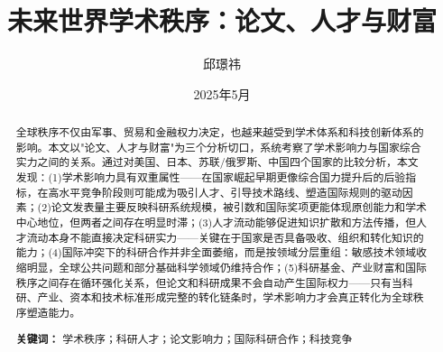 \documentclass[12pt,a4paper]{article}
\title{\heiti\zihao{2} 未来世界学术秩序：论文、人才与财富}
\author{邱璟祎}
\date{2025年5月}
\begin{document}
\maketitle
\thispagestyle{empty}

\begin{abstract}
\noindent 全球秩序不仅由军事、贸易和金融权力决定，也越来越受到学术体系和科技创新体系的影响。本文以"论文、人才与财富"为三个分析切口，系统考察了学术影响力与国家综合实力之间的关系。通过对美国、日本、苏联/俄罗斯、中国四个国家的比较分析，本文发现：(1)学术影响力具有双重属性——在国家崛起早期更像综合国力提升后的后验指标，在高水平竞争阶段则可能成为吸引人才、引导技术路线、塑造国际规则的驱动因素；(2)论文发表量主要反映科研系统规模，被引数和国际奖项更能体现原创能力和学术中心地位，但两者之间存在明显时滞；(3)人才流动能够促进知识扩散和方法传播，但人才流动本身不能直接决定科研实力——关键在于国家是否具备吸收、组织和转化知识的能力；(4)国际冲突下的科研合作并非全面萎缩，而是按领域分层重组：敏感技术领域收缩明显，全球公共问题和部分基础科学领域仍维持合作；(5)科研基金、产业财富和国际秩序之间存在循环强化关系，但论文和科研成果不会自动产生国际权力——只有当科研、产业、资本和技术标准形成完整的转化链条时，学术影响力才会真正转化为全球秩序塑造能力。

\vspace{0.5em}
\noindent\textbf{关键词：} 学术秩序；科研人才；论文影响力；国际科研合作；科技竞争
\end{abstract}

\newpage
\tableofcontents
\newpage








\newpage
\printbibliography[heading=bibintoc, title=参考文献]
\end{document}
